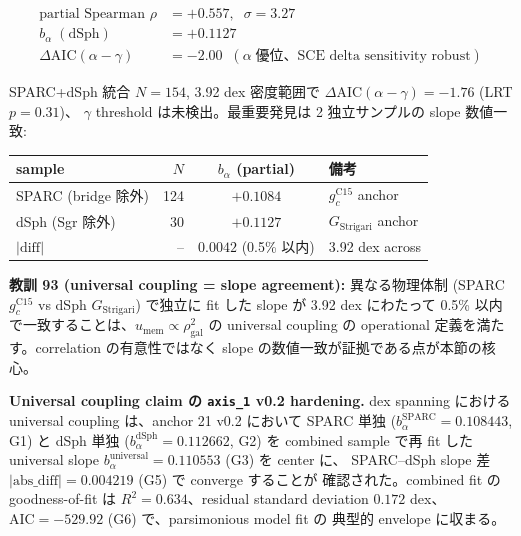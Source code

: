 \documentclass[11pt,a4paper]{ltjsarticle}
\newcommand{\bal}{b_{\alpha}}
\newcommand{\umem}{u_{\mathrm{mem}}}
\newcommand{\rhogal}{\rho_{\mathrm{gal}}}
\newcommand{\gc}{g_{c}}
\newcommand{\AIC}{\Delta\mathrm{AIC}}
\begin{document}
\begin{align*}
\text{partial Spearman } \rho &= +0.557,\;\; \sigma = 3.27 \\
\bal\;(\mathrm{dSph}) &= +0.1127 \\
\AIC(\alpha - \gamma) &= -2.00\;\;(\alpha\;\text{優位、SCE delta sensitivity robust})
\end{align*}

SPARC+dSph 統合 $N=154$, 3.92 dex 密度範囲で $\AIC(\alpha - \gamma) = -1.76$ (LRT $p = 0.31$)、
$\gamma$ threshold は未検出。最重要発見は 2 独立サンプルの slope 数値一致:

\begin{center}\small
\begin{tabular}{@{}lrcl@{}}
\toprule
sample & $N$ & $\bal$ (partial) & 備考 \\
\midrule
SPARC (bridge 除外) & 124 & $+0.1084$ & $\gc^{\mathrm{C15}}$ anchor \\
dSph (Sgr 除外) & 30 & $+0.1127$ & $G_{\mathrm{Strigari}}$ anchor \\
$|\text{diff}|$ & -- & $0.0042$ (0.5\% 以内) & 3.92 dex across \\
\bottomrule
\end{tabular}
\end{center}

\begin{keybox}
\textbf{教訓 93 (universal coupling = slope agreement):}
異なる物理体制 (SPARC $\gc^{\mathrm{C15}}$ vs dSph $G_{\mathrm{Strigari}}$) で独立に fit した
slope が 3.92 dex にわたって 0.5\% 以内で一致することは、$\umem \propto \rhogal^2$ の
universal coupling の operational 定義を満たす。correlation の有意性ではなく
slope の数値一致が証拠である点が本節の核心。
\end{keybox}


\noindent\textbf{Universal coupling claim の \texttt{axis\_1} v0.2 hardening.} dex spanning における universal coupling は、anchor 21 v0.2 において
SPARC 単独 ($b_\alpha^{\text{SPARC}} = 0.108443$, G1) と dSph 単独
($b_\alpha^{\text{dSph}} = 0.112662$, G2) を combined sample で再 fit した
universal slope $b_\alpha^{\text{universal}} = 0.110553$ (G3) を center に、
SPARC--dSph slope 差 $|\text{abs\_diff}| = 0.004219$ (G5) で converge することが
確認された。combined fit の goodness-of-fit は $R^2 = 0.634$、residual standard
deviation $0.172$ dex、$\mathrm{AIC} = -529.92$ (G6) で、parsimonious model fit の
典型的 envelope に収まる。
\end{document}
